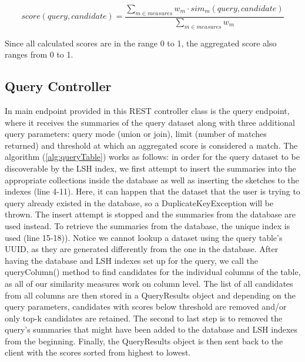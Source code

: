 \[score(query, candidate) = \frac{\sum_{m \in measures} w_m \cdot sim_m(query, candidate)}{\sum_{m \in measures} w_m}\]

Since all calculated scores are in the range 0 to 1, the aggregated score also ranges from 0 to 1.

\subsection{Query Controller}

In main endpoint provided in this REST controller class is the query endpoint, where it receives the summaries of the query dataset along with three additional query parameters: query mode (union or join), limit (number of matches returned) and threshold at which an aggregated score is considered a match. The algorithm (\ref{alg:queryTable}) works as follows: in order for the query dataset to be discoverable by the LSH index, we first attempt to insert the summaries into the appropriate collections inside the database as well as inserting the sketches to the indexes (line 4-11). Here, it can happen that the dataset that the user is trying to query already existed in the database, so a DuplicateKeyException will be thrown. The insert attempt is stopped and the summaries from the database are used instead. To retrieve the summaries from the database, the unique index is used (line 15-18)). Notice we cannot lookup a dataset using the query table's UUID, as they are generated differently from the one in the database. After having the database and LSH indexes set up for the query, we call the queryColumn() method to find candidates for the individual columns of the table, as all of our similarity measures work on column level. The list of all candidates from all columns are then stored in a QueryResults object and depending on the query parameters, candidates with scores below threshold are removed and/or only top-k candidates are retained. The second to last step is to removed the query's summaries that might have been added to the database and LSH indexes from the beginning. Finally, the QueryResults object is then sent back to the client with the scores sorted from highest to lowest.

